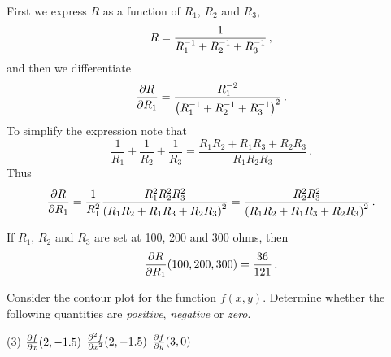 \begin{solution}
First we express $R$ as a function of $R_1$, $R_2$ and $R_3$,
\[
R = \frac{1}{R_1^{-1} + R_2^{-1} + R_3^{-1}}\,,
\]
and then we differentiate
\[
\frac{\partial R}{\partial R_1} = \frac{R_1^{-2}}{\left(R_1^{-1} + R_2^{-1} + R_3^{-1}\right)^2} \,.
\]
To simplify the expression note that
\[
\frac{1}{R_1} + \frac{1}{R_2} + \frac{1}{R_3} = \frac{R_1R_2 + R_1R_3 + R_2 R_3}{R_1R_2 R_3}\,.
\]
Thus
\[
\frac{\partial R}{\partial R_1} = \frac{1}{R_1^2} \frac{R_1^2R_2^2 R_3^2}{\left(R_1R_2 + R_1R_3 + R_2 R_3\right)^2}
= \frac{R_2^2 R_3^2}{\left(R_1R_2 + R_1R_3 + R_2 R_3\right)^2}\,.
\]

If $R_1$, $R_2$ and $R_3$ are set at 100, 200 and 300 ohms, then
\[
\frac{\partial R}{\partial R_1}(100,200,300) = \frac{36}{121}\,.
\]
\end{solution}

\begin{question}
Consider the contour plot for the function $f(x,y)$. Determine whether the following quantities are \emph{positive}, \emph{negative} or \emph{zero}.

\begin{center}
\end{center}

\begin{tasks}(3)
\task
$\frac{\partial f}{\partial x}(2,-1.5)$
\task
$\frac{\partial^2 f}{\partial x^2}(2,-1.5)$
\task
$\frac{\partial f}{\partial y}(3,0)$
\end{tasks}
\end{question}

